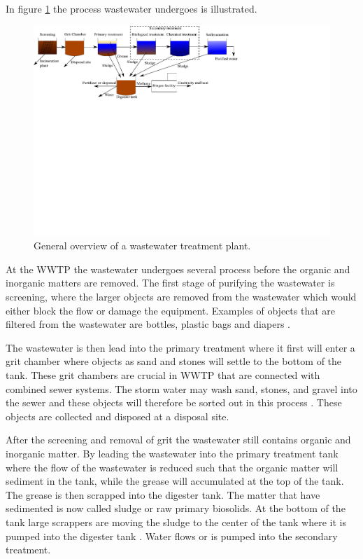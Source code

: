 In figure \ref{fig:wwtp_process} the process wastewater undergoes is illustrated. 
\begin{figure}[H]
\centering
\includegraphics[clip, trim=0cm 13cm 9cm 0cm, width=1.00\textwidth]{report/introduction/pictures/WWTP_overview}
\caption{General overview of a wastewater treatment plant.}
\label{fig:wwtp_process}
\end{figure}

At the WWTP the wastewater undergoes several process before the organic and inorganic matters are removed. The first stage of purifying the wastewater is screening, where the larger objects are removed from the wastewater which would either block the flow or damage the equipment. Examples of objects that are filtered from the wastewater are bottles, plastic bags and diapers \cite{wwtp_process}. %

The wastewater is then lead into the primary treatment where it first will enter a grit chamber where objects as sand and stones will settle to the bottom of the tank. These grit chambers are crucial in WWTP that are connected with combined sewer systems.%
The storm water may wash sand, stones, and gravel into the sewer and these objects will therefore be sorted out in this process \cite{epa_wwtp}. These objects are collected and disposed at a disposal site. 

After the screening and removal of grit the wastewater still contains organic and inorganic matter. By leading the wastewater into the primary treatment tank where the flow of the wastewater is reduced such that the organic matter will sediment in the tank, while the grease will accumulated at the top of the tank. The grease is then scrapped into the digester tank. The matter that have sedimented is now called sludge or raw primary biosolids. At the bottom of the tank large scrappers are moving the sludge to the center of the  tank where it is pumped into the digester tank \cite{epa_wwtp}. Water flows or is pumped into the secondary treatment. 

